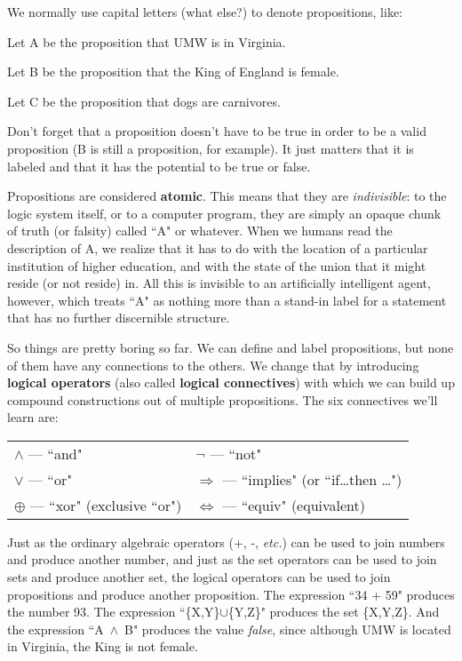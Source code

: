 We normally use capital letters (what else?) to denote propositions, like:

\quad\quad Let A be the proposition that UMW is in Virginia.

\quad\quad Let B be the proposition that the King of England is female.

\quad\quad Let C be the proposition that dogs are carnivores.

Don't forget that a proposition doesn't have to be true in order to be a
valid proposition (B is still a proposition, for example). It just matters
that it is labeled and that it has the potential to be true or false. 

Propositions are considered \textbf{atomic}. This means that they are
\textit{indivisible}: to the logic system itself, or to a computer program,
they are simply an opaque chunk of truth (or falsity) called ``A" or
whatever. When we humans read the description of A, we realize that it has
to do with the location of a particular institution of higher education,
and with the state of the union that it might reside (or not reside) in.
All this is invisible to an artificially intelligent agent, however, which
treats ``A" as nothing more than a stand-in label for a statement that has
no further discernible structure.

So things are pretty boring so far. We can define and label propositions,
but none of them have any connections to the others. We change that by
introducing \textbf{logical operators} (also called \textbf{logical
connectives}) with which we can build up compound constructions out of
multiple propositions. The six connectives we'll learn are:

\begin{center}
\begin{tabular}{l l}
$\wedge$ --- ``and" & \quad $\neg$ --- ``not"  \\
$\vee$ --- ``or" & \quad $\Rightarrow$ --- ``implies" (or ``if\dots then \dots") \\
$\oplus$ --- ``xor" (exclusive ``or") & \quad $\Leftrightarrow$ --- ``equiv" (equivalent)\\
\end{tabular}
\end{center}

Just as the ordinary algebraic operators (+, -, \textit{etc.}) can be used
to join numbers and produce another number, and just as the set operators
can be used to join sets and produce another set, the logical operators can
be used to join propositions and produce another proposition. The
expression ``34 + 59" produces the number 93. The expression
``\{X,Y\}$\cup$\{Y,Z\}" produces the set \{X,Y,Z\}. And the expression
``A~$\wedge$~B" produces the value \textsl{false}, since although UMW is
located in Virginia, the King is not female.

